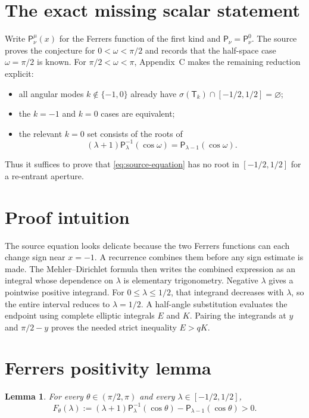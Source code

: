 \documentclass[11pt]{article}
\newtheorem{lemma}[theorem]{Lemma}
\newcommand{\PP}{\mathsf P}
\newcommand{\TT}{\mathsf T}
\begin{document}
\section{The exact missing scalar statement}

Write $\PP_\nu^\mu(x)$ for the Ferrers function of the first kind and
$\PP_\nu=\PP_\nu^0$.  The source proves the conjecture for
$0<\omega<\pi/2$ and records that the half-space case $\omega=\pi/2$ is
known.  For $\pi/2<\omega<\pi$, Appendix~C makes the remaining reduction
explicit:
\begin{itemize}
\item all angular modes $k\notin\{-1,0\}$ already have
      $\sigma(\TT_k)\cap[-1/2,1/2]=\varnothing$;
\item the $k=-1$ and $k=0$ cases are equivalent;
\item the relevant $k=0$ set consists of the roots of
\begin{equation}\label{eq:source-equation}
 (\lambda+1)\PP_\lambda^{-1}(\cos\omega)
 =\PP_{\lambda-1}(\cos\omega).
\end{equation}
\end{itemize}
Thus it suffices to prove that \eqref{eq:source-equation} has no root in
$[-1/2,1/2]$ for a re-entrant aperture.

\section{Proof intuition}

The source equation looks delicate because the two Ferrers functions can each
change sign near $x=-1$.  A recurrence combines them before any sign estimate
is made.  The Mehler--Dirichlet formula then writes the combined expression as
an integral whose dependence on $\lambda$ is elementary trigonometry.
Negative $\lambda$ gives a pointwise positive integrand.  For
$0\le\lambda\le1/2$, that integrand decreases with $\lambda$, so the entire
interval reduces to $\lambda=1/2$.  A half-angle substitution evaluates the
endpoint using complete elliptic integrals $E$ and $K$.  Pairing the integrands
at $y$ and $\pi/2-y$ proves the needed strict inequality $E>qK$.

\section{Ferrers positivity lemma}

\begin{lemma}\label{lem:positive}
For every $\theta\in(\pi/2,\pi)$ and every
$\lambda\in[-1/2,1/2]$,
\begin{equation}\label{eq:F}
 F_\theta(\lambda):=
 (\lambda+1)\PP_\lambda^{-1}(\cos\theta)
 -\PP_{\lambda-1}(\cos\theta)>0.
\end{equation}
\end{lemma}
\end{document}
